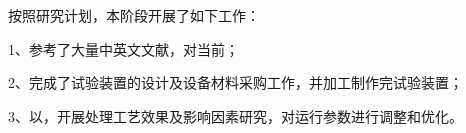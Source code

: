 按照研究计划，本阶段开展了如下工作：\par
1、参考了大量中英文文献，对当前；\par
2、完成了试验装置的设计及设备材料采购工作，并加工制作完试验装置；\par
3、以，开展处理工艺效果及影响因素研究，对运行参数进行调整和优化。\par